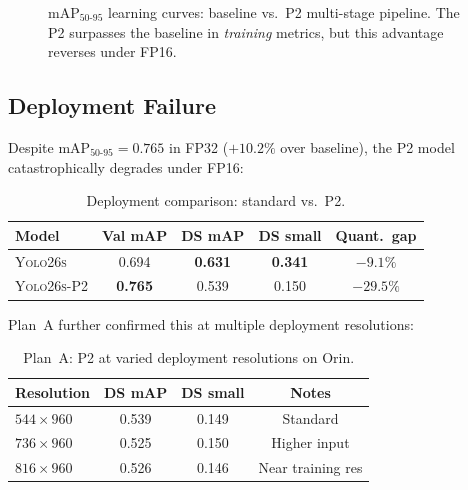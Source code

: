 \documentclass[12pt, titlepage]{article}
\begin{document}
\begin{figure}[H]
  \caption{mAP$_{50\text{-}95}$ learning curves: baseline vs.\
    P2 multi-stage pipeline.  The P2 surpasses the baseline in
    \emph{training} metrics, but this advantage reverses under FP16.}
  \label{fig:p2_curves}
\end{figure}

\subsection{Deployment Failure}

Despite mAP$_{50\text{-}95} = 0.765$ in FP32 ($+10.2\%$ over baseline), the P2
model catastrophically degrades under FP16:

\begin{table}[H]
  \centering
  \caption{Deployment comparison: standard vs.\ P2.}
  \label{tab:p2_deploy}
  \begin{tabular}{@{}lcccc@{}}
    \toprule
    \textbf{Model}      & \textbf{Val mAP} & \textbf{DS mAP} & \textbf{DS small} & \textbf{Quant.\ gap} \\
    \midrule
    \textsc{Yolo26s}    & 0.694            & \textbf{0.631}  & \textbf{0.341}    & $-9.1\%$             \\
    \textsc{Yolo26s-P2} & \textbf{0.765}   & 0.539           & 0.150             & $-29.5\%$            \\
    \bottomrule
  \end{tabular}
\end{table}

Plan~A further confirmed this at multiple deployment resolutions:

\begin{table}[H]
  \centering
  \caption{Plan~A: P2 at varied deployment resolutions on Orin.}
  \label{tab:plan_a}
  \begin{tabular}{@{}lccc@{}}
    \toprule
    \textbf{Resolution} & \textbf{DS mAP} & \textbf{DS small} & \textbf{Notes}    \\
    \midrule
    $544{\times}960$    & 0.539           & 0.149             & Standard          \\
    $736{\times}960$    & 0.525           & 0.150             & Higher input      \\
    $816{\times}960$    & 0.526           & 0.146             & Near training res \\
    \bottomrule
  \end{tabular}
\end{table}
\end{document}
